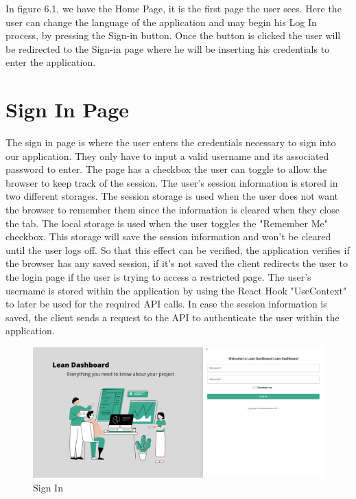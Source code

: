 \documentclass[a4paper,twoside,10pt]{report}
\begin{document}
In figure 6.1, we have the Home Page, it is the first page the user sees. Here the user can change the language of the application and may begin his Log In process, by pressing the Sign-in button. Once the button is clicked the user will be redirected to the Sign-in page where he will be inserting his credentials to enter the application.


\section{Sign In Page}
The sign in page is where the user enters the credentials necessary to sign into our application.
They only have to input a valid username and its associated password to enter.
\newline
The page has a checkbox the user can toggle to allow the browser to keep track of the session. 
The user's session information is stored in two different storages.
\newline
The session storage is used when the user does not want the browser to remember them since the information is cleared when they close the tab.
\newline
The local storage is used when the user toggles the "Remember Me" checkbox. This storage will save the session information and won't be cleared until the user logs off.
So that this effect can be verified, the application verifies if the browser has any saved session, if it's not saved the client redirects the user to the login page if the user is trying to access a restricted page.
\newline
The user's username is stored within the application by using the React Hook "UseContext" to later be used for the required API calls.
In case the session information is saved, the client sends a request to the API to authenticate the user within the application.

\begin{figure}[h!]
\center
    \includegraphics[width=\textwidth]{SignIn.png}
\caption{Sign In}
\end{figure}
\end{document}
